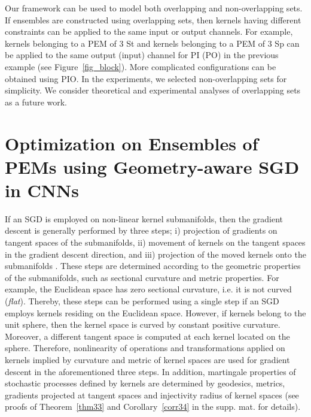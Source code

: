 \documentclass[10pt,journal,compsoc]{IEEEtran}
\theoremstyle{definition}
\theoremstyle{definition}
\theoremstyle{remark}
\theoremstyle{remark}
\theoremstyle{remark}
\begin{document}
Our framework can be used to model both overlapping and non-overlapping sets. If ensembles are constructed using overlapping sets, then kernels having different constraints can be applied to the same input or output channels. For example, kernels belonging to a PEM of 3 St and kernels belonging to a PEM of 3 Sp can be applied to the same output (input) channel for PI (PO) in the previous example (see Figure~\ref{fig_block}). More complicated configurations can be obtained using PIO. In the experiments, we selected non-overlapping sets for simplicity. We consider theoretical and experimental analyses of overlapping sets as a future work.




\section{Optimization on Ensembles of PEMs using Geometry-aware SGD in CNNs}
\label{sec3}
If an SGD is employed on non-linear kernel submanifolds, then the gradient descent is generally performed by three steps;  i) projection of gradients on tangent spaces of the submanifolds, ii) movement of kernels on the tangent spaces in the gradient descent direction, and iii)  projection of the moved kernels onto the submanifolds \cite{oo16}. These steps are determined according to the geometric properties of the submanifolds, such as sectional curvature and metric properties. For example, the Euclidean space has zero sectional curvature, i.e. it is not curved (\textit{flat}). Thereby, these steps can be performed using a single step if an SGD employs kernels residing on the Euclidean space. However, if kernels belong to the unit sphere, then the kernel space is curved by constant positive curvature. Moreover, a different tangent space is computed at each kernel located on the sphere. Therefore, nonlinearity of operations and transformations applied on kernels implied by curvature and metric of kernel spaces are used for gradient descent in the aforementioned three steps. In addition, martingale properties of stochastic processes defined by kernels are determined by geodesics, metrics, gradients projected at tangent spaces and injectivity radius of kernel spaces (see proofs of Theorem~\ref{thm33} and Corollary~\ref{corr34} in the supp. mat. for details). 
\end{document}
